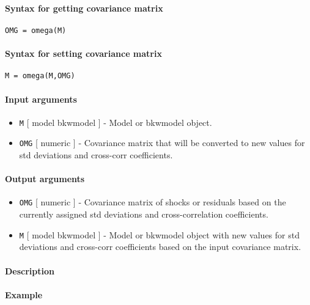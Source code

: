 


	\paragraph{Syntax for getting covariance
matrix}

\begin{verbatim}
OMG = omega(M)
\end{verbatim}

\paragraph{Syntax for setting covariance
matrix}

\begin{verbatim}
M = omega(M,OMG)
\end{verbatim}

\paragraph{Input arguments}

\begin{itemize}
\item
  \texttt{M} {[} model \textbar{} bkwmodel {]} - Model or bkwmodel
  object.
\item
  \texttt{OMG} {[} numeric {]} - Covariance matrix that will be
  converted to new values for std deviations and cross-corr
  coefficients.
\end{itemize}

\paragraph{Output arguments}

\begin{itemize}
\item
  \texttt{OMG} {[} numeric {]} - Covariance matrix of shocks or
  residuals based on the currently assigned std deviations and
  cross-correlation coefficients.
\item
  \texttt{M} {[} model \textbar{} bkwmodel {]} - Model or bkwmodel
  object with new values for std deviations and cross-corr coefficients
  based on the input covariance matrix.
\end{itemize}

\paragraph{Description}

\paragraph{Example}


